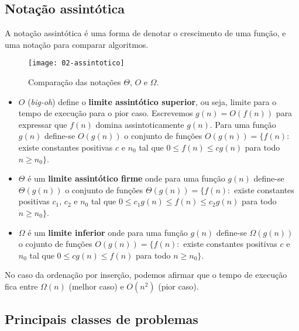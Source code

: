 \subsection{Notação assintótica}

A notação assintótica é uma forma de denotar o crescimento de uma função,
e uma notação para comparar algoritmos.
%
\begin{figure}[ht]
\centering
\texttt{[image: 02-assintotico]}
\caption{Comparação das notações $\Theta$, $O$ e $\Omega$.}
\label{aula02:fig:assintotico}
\end{figure}

\begin{itemize}
\item $O$ (\emph{big-oh}) define o {\bf limite assintótico superior}, ou seja, 
limite para o tempo de execução para o pior caso. Escrevemos $g(n) = O(f(n))$ para
expressar que $f(n)$ domina assintoticamente $g(n)$. Para
uma função $g(n)$ define-se $O(g(n))$ o conjunto de funções 
$O(g(n)) = \{f(n):$ existe constantes positivas $c$ e $n_0$ tal que $0 \leq f(n) \leq c g(n)$ 
para todo $n \geq n_0\}$.

\item $\Theta$ é um {\bf limite assintótico firme} onde 
para uma função $g(n)$ define-se $\Theta(g(n))$ o conjunto de funções 
$\Theta(g(n)) = \{f(n):$ existe constantes positivas $c_1$, $c_2$ e $n_0$ tal que 
$0 \leq c_1 g(n) \leq f(n) \leq c_2 g(n)$ 
para todo $n \geq n_0\}$.

\item $\Omega$ é um {\bf limite inferior} onde para uma função $g(n)$ 
define-se $\Omega(g(n))$ o cojunto de funções
$O(g(n)) = \{f(n):$ existe constantes positivas $c$ e $n_0$ tal que $0 \leq c g(n) \leq f(n)$ 
para todo $n \geq n_0\}$.

\end{itemize}

No caso da ordenação por inserção, podemos afirmar que o tempo de execução fica entre
$\Omega(n)$ (melhor caso) e $O(n^2)$ (pior caso).

\subsection{Principais classes de problemas}

